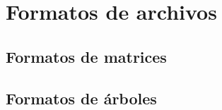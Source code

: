 \chapter{Formatos de archivos}
\section{Formatos de matrices}



%

\section{Formatos de \'arboles}




